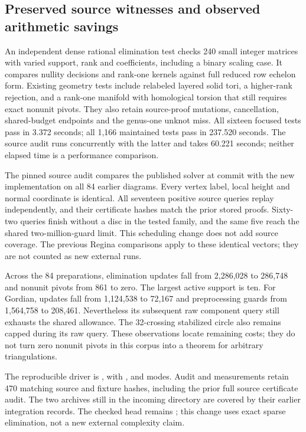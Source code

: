 \subsection{Preserved source witnesses and observed arithmetic savings}

An independent dense rational elimination test checks 240 small integer
matrices with varied support, rank and coefficients, including a binary
scaling case. It compares nullity decisions and rank-one kernels against
full reduced row echelon form. Existing geometry tests include relabeled
layered solid tori, a higher-rank rejection, and a rank-one manifold with
homological torsion that still requires exact nonunit pivots. They also
retain source-proof mutations, cancellation, shared-budget endpoints and
the genus-one unknot miss.
All sixteen focused tests pass in 3.372 seconds; all 1,166 maintained tests
pass in 237.520 seconds. The source audit runs concurrently with the latter
and takes 60.221 seconds; neither elapsed time is a performance comparison.

The pinned source audit compares the published solver at commit
 with the new implementation on all 84 earlier diagrams.
Every vertex label, local height and normal coordinate is identical.
All seventeen positive source queries replay independently, and their
certificate hashes match the prior stored proofs. Sixty-two queries finish
without a disc in the tested family, and the same five reach the shared
two-million-guard limit. This scheduling change does not add source coverage.
The previous Regina comparisons apply to these identical vectors; they are
not counted as new external runs.

Across the 84 preparations, elimination updates fall from 2,286,028 to
286,748 and nonunit pivots from 861 to zero. The largest active support is
ten. For Gordian, updates fall from 1,124,538 to 72,167 and preprocessing
guards from 1,564,758 to 208,461. Nevertheless its subsequent raw component
query still exhausts the shared allowance. The 32-crossing stabilized
circle also remains capped during its raw query. These observations locate
remaining costs; they do not turn zero nonunit pivots in this corpus into
a theorem for arbitrary triangulations.



The reproducible driver is
, with ,
 and  modes. Audit and measurements retain
470 matching source and fixture hashes, including the prior full source
certificate audit. The two archives still in the incoming directory are covered
by their earlier integration records. The checked  head
remains ; this change uses
exact sparse elimination, not a new external complexity claim.

